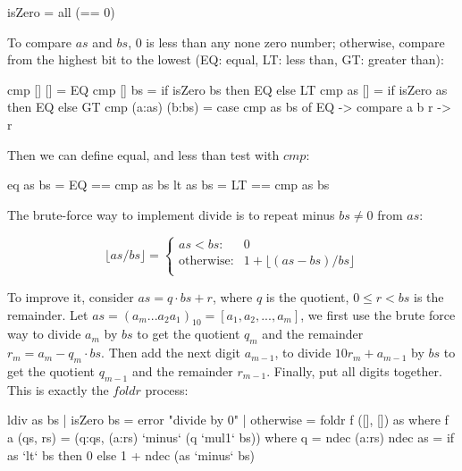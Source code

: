 \documentclass[b5paper]{article}
\begin{document}
\begin{Answer}[ref = {ex:list-others}]
{\begin{Haskell}
isZero = all (== 0)
\end{Haskell}

To compare $as$ and $bs$, 0 is less than any none zero number; otherwise, compare from the highest bit to the lowest (EQ: equal, LT: less than, GT: greater than):

\begin{Haskell}
cmp [] [] = EQ
cmp [] bs = if isZero bs then EQ else LT
cmp as [] = if isZero as then EQ else GT
cmp (a:as) (b:bs) = case cmp as bs of EQ -> compare a b
                                      r -> r
\end{Haskell}

Then we can define equal, and less than test with $cmp$:

\begin{Haskell}
eq as bs = EQ == cmp as bs
lt as bs = LT == cmp as bs
\end{Haskell}

The brute-force way to implement divide is to repeat minus $bs \neq 0$ from $as$:

\[
\lfloor as / bs \rfloor = \begin{cases}
as < bs: & 0 \\
\text{otherwise}: & 1 + \lfloor (as - bs) / bs \rfloor \\
\end{cases}
\]

To improve it, consider $as = q \cdot bs + r$, where $q$ is the quotient, $0 \leq r < bs$ is the remainder. Let $as = (a_m...a_2a_1)_{10} = [a_1, a_2, ..., a_m]$, we first use the brute force way to divide $a_m$ by $bs$ to get the quotient $q_m$ and the remainder $r_m = a_m - q_m \cdot bs$. Then add the next digit $a_{m-1}$, to divide $10 r_{m} + a_{m-1}$ by $bs$ to get the quotient $q_{m-1}$ and the remainder $r_{m-1}$. Finally, put all digits together. This is exactly the $foldr$ process:

\begin{Haskell}
ldiv as bs | isZero bs = error "divide by 0"
           | otherwise = foldr f ([], []) as where
  f a (qs, rs) = (q:qs, (a:rs) `minus` (q `mul1` bs)) where
    q =  ndec (a:rs)
  ndec as = if as `lt` bs then 0 else 1 + ndec (as `minus` bs)
\end{Haskell}
}

\end{Answer}
\end{document}
